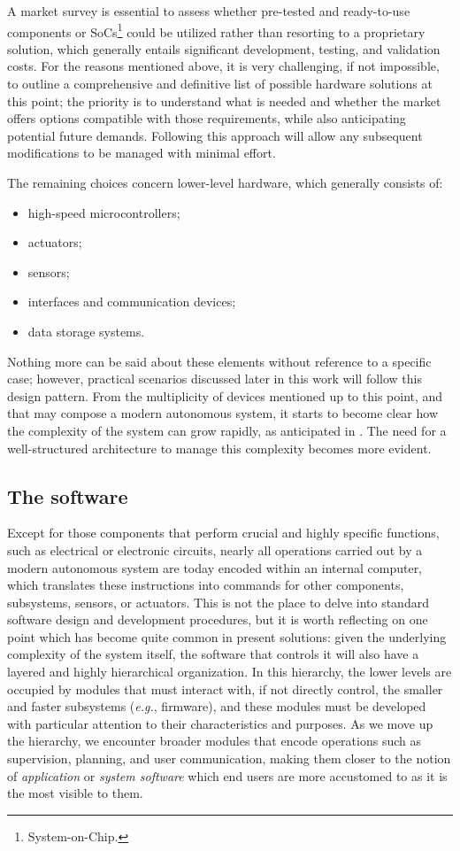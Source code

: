 A market survey is essential to assess whether pre-tested and ready-to-use components or SoCs\footnote{System-on-Chip.} could be utilized rather than resorting to a proprietary solution, which generally entails significant development, testing, and validation costs. For the reasons mentioned above, it is very challenging, if not impossible, to outline a comprehensive and definitive list of possible hardware solutions at this point; the priority is to understand what is needed and whether the market offers options compatible with those requirements, while also anticipating potential future demands. Following this approach will allow any subsequent modifications to be managed with minimal effort.

The remaining choices concern lower-level hardware, which generally consists of:
\begin{itemize}
    \item high-speed microcontrollers;
    \item actuators;
    \item sensors;
    \item interfaces and communication devices;
    \item data storage systems.
\end{itemize}

Nothing more can be said about these elements without reference to a specific case; however, practical scenarios discussed later in this work will follow this design pattern. From the multiplicity of devices mentioned up to this point, and that may compose a modern autonomous system, it starts to become clear how the complexity of the system can grow rapidly, as anticipated in . The need for a well-structured architecture to manage this complexity becomes more evident.

\subsection{The software}
\label{sec:design_challenges_software}
Except for those components that perform crucial and highly specific functions, such as electrical or electronic circuits, nearly all operations carried out by a modern autonomous system are today encoded within an internal computer, which translates these instructions into commands for other components, subsystems, sensors, or actuators. This is not the place to delve into standard software design and development procedures, but it is worth reflecting on one point which has become quite common in present solutions: given the underlying complexity of the system itself, the software that controls it will also have a layered and highly hierarchical organization. In this hierarchy, the lower levels are occupied by modules that must interact with, if not directly control, the smaller and faster subsystems (\emph{e.g.}, firmware), and these modules must be developed with particular attention to their characteristics and purposes. As we move up the hierarchy, we encounter broader modules that encode operations such as supervision, planning, and user communication, making them closer to the notion of \emph{application} or \emph{system software} which end users are more accustomed to as it is the most visible to them.

